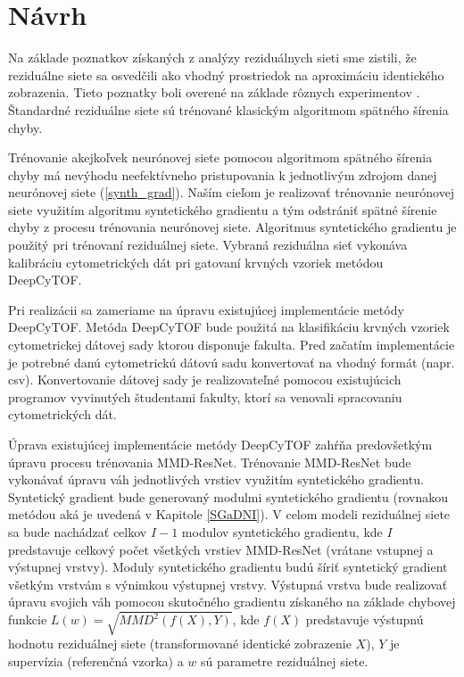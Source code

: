 \chapter{Návrh}  %

Na základe poznatkov získaných z analýzy reziduálnych sieti sme zistili, že reziduálne siete sa osvedčili ako vhodný prostriedok na aproximáciu identického zobrazenia. Tieto poznatky boli overené na základe rôznych experimentov \cite{Targ2016, He2016, Wu2017}. Štandardné reziduálne siete sú trénované klasickým algoritmom spätného šírenia chyby.

Trénovanie akejkoľvek neurónovej siete pomocou algoritmom spätného šírenia chyby má nevýhodu neefektívneho pristupovania k jednotlivým zdrojom danej neurónovej siete (\ref{synth_grad}). Naším cieľom je realizovať trénovanie neurónovej siete využitím algoritmu syntetického gradientu a tým odstrániť spätné šírenie chyby z procesu trénovania neurónovej siete. Algoritmus syntetického gradientu je použitý pri trénovaní reziduálnej siete. Vybraná reziduálna sieť vykonáva kalibráciu cytometrických dát pri gatovaní krvných vzoriek metódou DeepCyTOF.

Pri realizácii sa zameriame na úpravu existujúcej implementácie metódy DeepCyTOF. Metóda DeepCyTOF bude použitá na klasifikáciu krvných vzoriek cytometrickej dátovej sady ktorou disponuje fakulta. Pred začatím implementácie je potrebné danú cytometrickú dátovú sadu konvertovať na vhodný formát (napr. csv). Konvertovanie dátovej sady je realizovateľné pomocou existujúcich programov vyvinutých študentami fakulty, ktorí sa venovali spracovaniu cytometrických dát.

Úprava existujúcej implementácie metódy DeepCyTOF zahŕňa predovšetkým úpravu procesu trénovania MMD-ResNet. Trénovanie MMD-ResNet bude vykonávať úpravu váh jednotlivých vrstiev využitím syntetického gradientu. Syntetický gradient bude generovaný modulmi syntetického gradientu (rovnakou metódou aká je uvedená v Kapitole \ref{SGaDNI}). V celom modeli reziduálnej siete sa bude nachádzať celkov $I-1$ modulov syntetického gradientu, kde $I$ predstavuje celkový počet všetkých vrstiev MMD-ResNet (vrátane vstupnej a výstupnej vrstvy). Moduly syntetického gradientu budú šíriť syntetický gradient všetkým vrstvám s výnimkou výstupnej vrstvy. Výstupná vrstva bude realizovať úpravu svojich váh pomocou skutočného gradientu získaného na základe chybovej funkcie $L(w) = \sqrt{MMD^2(f(X),Y)}$, kde $f(X)$ predstavuje výstupnú hodnotu reziduálnej siete (transformované identické zobrazenie $X$), $Y$ je supervízia (referenčná vzorka) a $w$ sú parametre reziduálnej siete.

